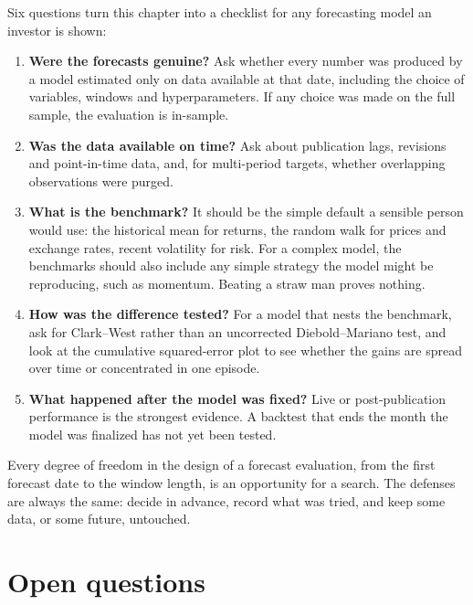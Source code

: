 Six questions turn this chapter into a checklist for any forecasting model an investor is shown:

\begin{enumerate}
  \item \textbf{Were the forecasts genuine?} Ask whether every number was produced by a model estimated only on data available at that date, including the choice of variables, windows and hyperparameters. If any choice was made on the full sample, the evaluation is in-sample.
  \item \textbf{Was the data available on time?} Ask about publication lags, revisions and point-in-time data, and, for multi-period targets, whether overlapping observations were purged.
  \item \textbf{What is the benchmark?} It should be the simple default a sensible person would use: the historical mean for returns, the random walk for prices and exchange rates, recent volatility for risk. For a complex model, the benchmarks should also include any simple strategy the model might be reproducing, such as momentum. Beating a straw man proves nothing.
  \item \textbf{How was the difference tested?} For a model that nests the benchmark, ask for Clark--West rather than an uncorrected Diebold--Mariano test, and look at the cumulative squared-error plot to see whether the gains are spread over time or concentrated in one episode.
  \item \textbf{What happened after the model was fixed?} Live or post-publication performance is the strongest evidence. A backtest that ends the month the model was finalized has not yet been tested.
\end{enumerate}

Every degree of freedom in the design of a forecast evaluation, from the first forecast date to the window length, is an opportunity for a search. The defenses are always the same: decide in advance, record what was tried, and keep some data, or some future, untouched.

\section{Open questions}
\label{sec:05-open}

